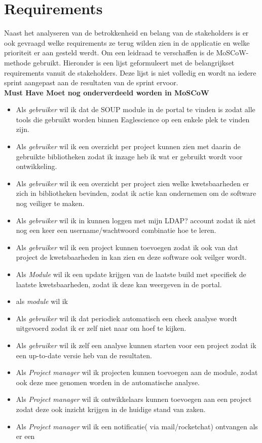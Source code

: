 \section{Requirements}
Naast het analyseren van de betrokkenheid en belang van de stakeholders is er ook gevraagd welke requirements ze terug wilden zien in de applicatie en welke prioriteit er aan gesteld werdt. Om een leidraad te verschaffen is de MoSCoW-methode gebruikt. Hieronder is een lijst geformuleert met de belangrijkset requirements vanuit de stakeholders. Deze lijst is niet volledig en wordt na iedere sprint aangepast aan de resultaten van de sprint ervoor.\\

\textbf{Must Have Moet nog onderverdeeld worden in MoSCoW}
\begin{itemize}
  \item Als \textit{gebruiker} wil ik dat de SOUP module in de portal te vinden is zodat alle tools die gebruikt worden binnen Eaglescience op een enkele plek te vinden zijn.
  \item Als \textit{gebruiker} wil ik een overzicht per project kunnen zien met daarin de gebruikte bibliotheken zodat ik inzage heb ik wat er gebruikt wordt voor ontwikkeling.
  \item Als \textit{gebruiker} wil ik een overzicht per project zien welke kwetsbaarheden er zich in bibliotheken bevinden, zodat ik actie kan ondernemen om de software nog veiliger te maken.
  \item Als \textit{gebruiker} wil ik in kunnen loggen met mijn LDAP? account zodat ik niet nog een keer een username/wachtwoord combinatie hoe te leren.
  \item Als \textit{gebruiker} wil ik een project kunnen toevoegen zodat ik ook van dat project de kwetsbaarheden in kan zien en deze software ook veilger wordt.
  \item Als \textit{Module} wil ik een update krijgen van de laatste build met specifiek de laatste kwetsbaarheden, zodat ik deze kan weergeven in de portal.
  \item als \textit{module} wil ik
  \item Als \textit{gebruiker} wil ik dat periodiek automatisch een check analyse wordt uitgevoerd zodat ik er zelf niet naar om hoef te kijken.
  \item Als \textit{gebruiker} wil ik zelf een analyse kunnen starten voor een project zodat ik een up-to-date versie heb van de resultaten.
  \item Als \textit{Project manager} wil ik projecten kunnen toevoegen aan de module, zodat ook deze mee genomen worden in de automatische analyse.
  \item Als \textit{Project manager} wil ik ontwikkelaars kunnen toevoegen aan een project zodat deze ook inzicht krijgen in de huidige stand van zaken.
  \item Als \textit{Project manager} wil ik een notificatie( via mail/rocketchat) ontvangen als er een
\end{itemize}

